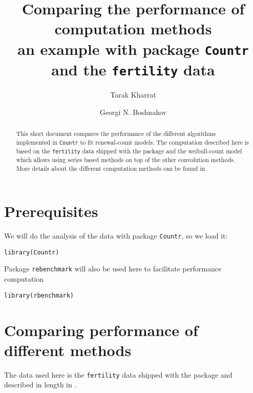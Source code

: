 \documentclass[a4paper,twoside,11pt]{article}
\author[1]{Tarak Kharrat}
\author[2]{Georgi N. Boshnakov}
\affil[1]{Salford Business School, University of Salford, UK.}
\affil[2]{School of Mathematics, University of Manchester, UK.}
\date{}
\title{Comparing the performance of computation methods\\\medskip
\large an example with package \texttt{Countr} and the \texttt{fertility} data}
\begin{document}
\maketitle
\begin{abstract}
This short document compares the performance of the different algorithms
implemented in \texttt{Countr} to fit renewal-count models. The computation described
here is based on the \texttt{fertility} data shipped with the package and the
weibull-count model which allows using series based methods on top of the other
convolution methods. More details about the different computation methods can be
found in \citet{baker2017event}.
\end{abstract}


\section{Prerequisites}
\label{sec:org6deafec}

We will do the analysis of the data with package \texttt{Countr}, so we load it:
\begin{verbatim}
library(Countr)
\end{verbatim}

Package \texttt{rebenchmark} \citep{rbench2012} will also be used here to facilitate
performance computation
\begin{verbatim}
library(rbenchmark) 
\end{verbatim}

\section{Comparing performance of different methods}
\label{sec:org7674dd3}
The data used here is the \texttt{fertility} data shipped with the package and
described in length in \citet{winkelmann1995duration}. 
\end{document}
